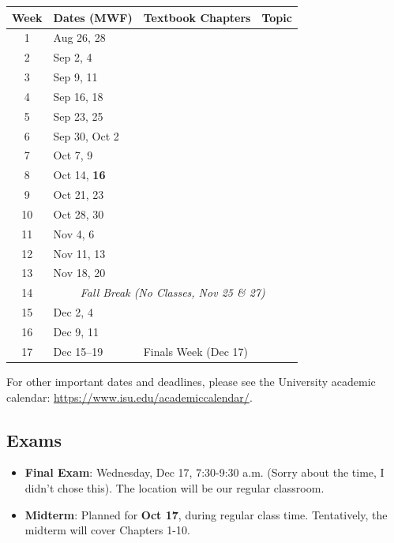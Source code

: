 \documentclass[11pt]{article}\usepackage[]{graphicx}\usepackage[]{xcolor}
\begin{document}
\begin{longtable}{|c|l|l|l|}
\hline
\textbf{Week} & \textbf{Dates (MWF)} & \textbf{Textbook Chapters} & \textbf{Topic} \\
\hline
\endhead

1 & Aug 26, 28     &  &  \\\hline
2 & Sep 2, 4       &  &  \\\hline
3 & Sep 9, 11      &  &  \\\hline
4 & Sep 16, 18     &  &  \\\hline
5 & Sep 23, 25     &  &  \\\hline
6 & Sep 30, Oct 2  &  &  \\\hline
7 & Oct 7, 9       &  &  \\\hline
8 & Oct 14, {\color{blue} \textbf{16}}     &  &  \\\hline
9 & Oct 21, 23     &  &  \\\hline
10 & Oct 28, 30    &  &  \\\hline
11 & Nov 4, 6      &  &  \\\hline
12 & Nov 11, 13    &  &  \\\hline
13 & Nov 18, 20    &  &  \\\hline
14 & \multicolumn{3}{|c|}{\textit{Fall Break (No Classes, Nov 25 \& 27)}} \\\hline
15 & Dec 2, 4      &  &  \\\hline
16 & Dec 9, 11     &  &  \\\hline
17 & Dec 15--19 & \multicolumn{2}{l|}{Finals Week (Dec 17)} \\ \hline

\end{longtable}


For other important dates and deadlines, please see the University academic calendar: \url{https://www.isu.edu/academiccalendar/}.

\subsection{Exams}

\begin{itemize}
  \item \textbf{Final Exam}: Wednesday, Dec 17, 7:30-9:30 a.m. (Sorry about the time, I didn't chose this). The location will be our regular classroom. 
  \item \textbf{Midterm}: Planned for {\color{blue} \textbf{Oct 17}}, during regular class time. Tentatively, the midterm will cover Chapters 1-10.
\end{itemize}
\end{document}
